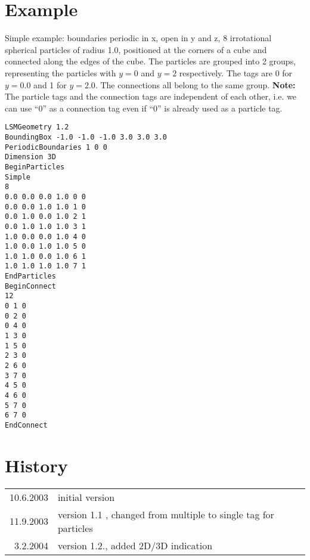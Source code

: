 \section{Example}
Simple example: boundaries periodic in x, open in y and z, 8 irrotational spherical particles of radius 1.0, positioned at the corners of a cube and connected along the edges of the cube. The particles are grouped into 2 groups, representing the particles with $y=0$ and $y=2$ respectively. The tags are 0 for $y=0.0$ and 1 for $y=2.0$. The connections all belong to the same group. \textbf{Note:} The particle tags and the connection tags are independent of each other, i.e. we can use ``0'' as a connection tag even if ``0'' is already used as a particle tag. 
\begin{verbatim}
LSMGeometry 1.2
BoundingBox -1.0 -1.0 -1.0 3.0 3.0 3.0
PeriodicBoundaries 1 0 0
Dimension 3D
BeginParticles
Simple
8
0.0 0.0 0.0 1.0 0 0
0.0 0.0 1.0 1.0 1 0
0.0 1.0 0.0 1.0 2 1
0.0 1.0 1.0 1.0 3 1 
1.0 0.0 0.0 1.0 4 0
1.0 0.0 1.0 1.0 5 0
1.0 1.0 0.0 1.0 6 1 
1.0 1.0 1.0 1.0 7 1 
EndParticles
BeginConnect
12
0 1 0
0 2 0
0 4 0
1 3 0
1 5 0
2 3 0
2 6 0
3 7 0
4 5 0
4 6 0
5 7 0
6 7 0
EndConnect
\end{verbatim}


\section{History}
\begin{tabular}{|r|l|}
\hline
10.6.2003 & initial version \\
11.9.2003 & version 1.1 , changed from multiple to single tag for particles \\
3.2.2004 & version 1.2., added 2D/3D indication \\
\hline
\end{tabular}

